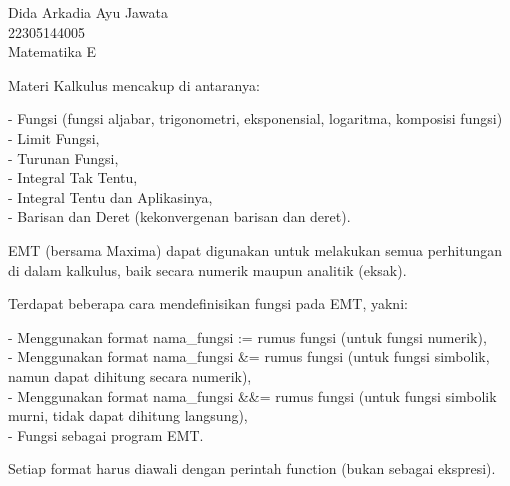 \documentclass[a4paper,10pt]{article}
\begin{document}
\begin{eulernotebook}
\begin{eulercomment}
Dida Arkadia Ayu Jawata\\
22305144005\\
Matematika E

\begin{eulercomment}
\begin{eulercomment}
Materi Kalkulus mencakup di antaranya:

- Fungsi (fungsi aljabar, trigonometri, eksponensial, logaritma,
komposisi fungsi)\\
- Limit Fungsi,\\
- Turunan Fungsi,\\
- Integral Tak Tentu,\\
- Integral Tentu dan Aplikasinya,\\
- Barisan dan Deret (kekonvergenan barisan dan deret).

EMT (bersama Maxima) dapat digunakan untuk melakukan semua perhitungan
di dalam kalkulus, baik secara numerik maupun analitik (eksak).

\end{eulercomment}
\begin{eulercomment}
Terdapat beberapa cara mendefinisikan fungsi pada EMT, yakni:

- Menggunakan format nama\_fungsi := rumus fungsi (untuk fungsi
numerik),\\
- Menggunakan format nama\_fungsi \&= rumus fungsi (untuk fungsi
simbolik, namun dapat dihitung secara numerik),\\
- Menggunakan format nama\_fungsi \&\&= rumus fungsi (untuk fungsi
simbolik murni, tidak dapat dihitung langsung),\\
- Fungsi sebagai program EMT.

Setiap format harus diawali dengan perintah function (bukan sebagai
ekspresi).


\end{eulercomment}
\end{eulercomment}
\end{eulercomment}
\end{eulernotebook}
\end{document}
